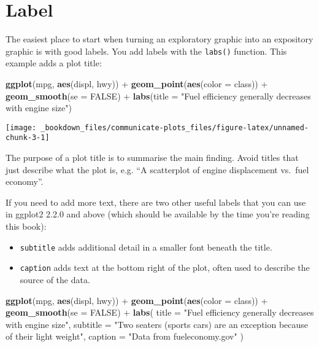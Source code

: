 \documentclass[]{book}
\newenvironment{Shaded}{\begin{snugshade}}{\end{snugshade}}
\newcommand{\KeywordTok}[1]{\textcolor[rgb]{0.13,0.29,0.53}{\textbf{{#1}}}}
\newcommand{\DataTypeTok}[1]{\textcolor[rgb]{0.13,0.29,0.53}{{#1}}}
\newcommand{\StringTok}[1]{\textcolor[rgb]{0.31,0.60,0.02}{{#1}}}
\newcommand{\OtherTok}[1]{\textcolor[rgb]{0.56,0.35,0.01}{{#1}}}
\newcommand{\NormalTok}[1]{{#1}}
\begin{document}
\section{Label}\label{label}

The easiest place to start when turning an exploratory graphic into an
expository graphic is with good labels. You add labels with the
\texttt{labs()} function. This example adds a plot title:

\begin{Shaded}
\begin{Highlighting}[]
\KeywordTok{ggplot}\NormalTok{(mpg, }\KeywordTok{aes}\NormalTok{(displ, hwy)) +}
\StringTok{  }\KeywordTok{geom_point}\NormalTok{(}\KeywordTok{aes}\NormalTok{(}\DataTypeTok{color =} \NormalTok{class)) +}
\StringTok{  }\KeywordTok{geom_smooth}\NormalTok{(}\DataTypeTok{se =} \OtherTok{FALSE}\NormalTok{) +}
\StringTok{  }\KeywordTok{labs}\NormalTok{(}\DataTypeTok{title =} \StringTok{"Fuel efficiency generally decreases with engine size"}\NormalTok{)}
\end{Highlighting}
\end{Shaded}

\begin{center}\texttt{[image: \_bookdown\_files/communicate-plots\_files/figure-latex/unnamed-chunk-3-1]} \end{center}

The purpose of a plot title is to summarise the main finding. Avoid
titles that just describe what the plot is, e.g. ``A scatterplot of
engine displacement vs.~fuel economy''.

If you need to add more text, there are two other useful labels that you
can use in ggplot2 2.2.0 and above (which should be available by the
time you're reading this book):

\begin{itemize}
\item
  \texttt{subtitle} adds additional detail in a smaller font beneath the
  title.
\item
  \texttt{caption} adds text at the bottom right of the plot, often used
  to describe the source of the data.
\end{itemize}

\begin{Shaded}
\begin{Highlighting}[]
\KeywordTok{ggplot}\NormalTok{(mpg, }\KeywordTok{aes}\NormalTok{(displ, hwy)) +}
\StringTok{  }\KeywordTok{geom_point}\NormalTok{(}\KeywordTok{aes}\NormalTok{(}\DataTypeTok{color =} \NormalTok{class)) +}
\StringTok{  }\KeywordTok{geom_smooth}\NormalTok{(}\DataTypeTok{se =} \OtherTok{FALSE}\NormalTok{) +}
\StringTok{  }\KeywordTok{labs}\NormalTok{(}
    \DataTypeTok{title =} \StringTok{"Fuel efficiency generally decreases with engine size"}\NormalTok{,}
    \DataTypeTok{subtitle =} \StringTok{"Two seaters (sports cars) are an exception because of their light weight"}\NormalTok{,}
    \DataTypeTok{caption =} \StringTok{"Data from fueleconomy.gov"}
  \NormalTok{)}
\end{Highlighting}
\end{Shaded}
\end{document}
